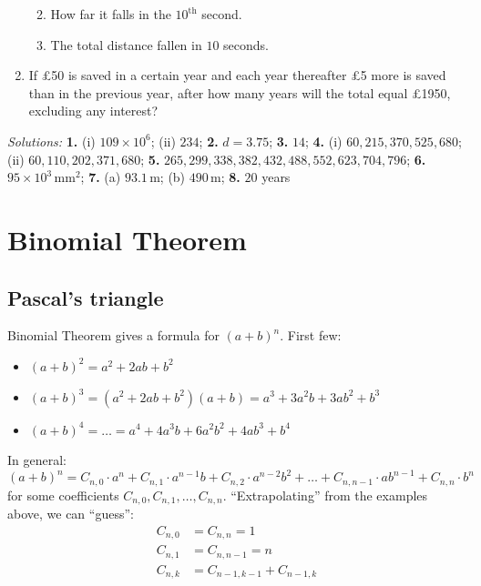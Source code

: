 \documentclass[
  12pt,
  oneside]{book}
\providecommand{\tightlist}{%
  \setlength{\itemsep}{0pt}\setlength{\parskip}{0pt}}
\theoremstyle{definition}
\theoremstyle{definition}
\theoremstyle{definition}
\theoremstyle{definition}
\theoremstyle{remark}
\begin{document}
\begin{enumerate}
  \begin{enumerate}
  \def\labelenumii{\alph{enumii})}
  \tightlist
  \item
    How far it falls in the \(10^{\mathrm{th}}\) second.
  \item
    The total distance fallen in \(10\) seconds.
  \end{enumerate}
\item
  If £50 is saved in a certain year and each year thereafter £5 more is saved than in the previous year, after how many years will the total equal £1950, excluding any interest?
\end{enumerate}

\emph{Solutions:}
\textbf{1.} (i) \(109\times 10^6\); (ii) \(234\);
\textbf{2.} \(d=3.75\);
\textbf{3.} \(14\);
\textbf{4.} (i) \(60,215,370,525,680\); (ii) \(60,110,202,371,680\);
\textbf{5.} \(265,299,338,382,432,488,552,623,704,796\);
\textbf{6.} \(95\times 10^3\,\mathrm{mm}^2\);
\textbf{7.} (a) \(93.1\,\mathrm{m}\); (b) \(490\,\mathrm{m}\);
\textbf{8.} \(20\) years

\hypertarget{binomial-theorem}{%
\chapter{Binomial Theorem}\label{binomial-theorem}}

\hypertarget{pascals-triangle}{%
\section{Pascal's triangle}\label{pascals-triangle}}

Binomial Theorem gives a formula for \((a+b)^n\).
First few:

\begin{itemize}
\tightlist
\item
  \((a+b)^2 = a^2+2ab+b^2\)
\item
  \((a+b)^3 = (a^2+2ab+b^2)(a+b) = a^3+3a^2b+3ab^2+b^3\)
\item
  \((a+b)^4 = \dots = a^4+4a^3b+6a^2b^2 + 4ab^3 + b^4\)
\end{itemize}

In general:
\[
(a+b)^n = C_{n,0}\cdot a^n + C_{n,1}\cdot a^{n-1}b + C_{n,2}\cdot a^{n-2}b^2 + \dots + C_{n,n-1}\cdot ab^{n-1} + C_{n,n}\cdot b^n
\]
for some coefficients \(C_{n,0},C_{n,1},\dots,C_{n,n}\). ``Extrapolating'' from the examples above, we can ``guess'':
\begin{align*}
    C_{n,0} &= C_{n,n} = 1\\
    C_{n,1} &= C_{n,n-1} = n\\
    C_{n,k} &= C_{n-1,k-1}+C_{n-1,k}
\end{align*}
\end{document}
